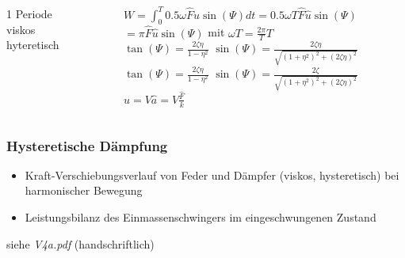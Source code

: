 \begin{frame}
        \begin{columns}
                \begin{column}[t]{0.2 \textwidth}
                        1 Periode 
                        \vspace{0.65cm}\\
                        viskos 
                        \vspace{0.24cm}\\
                        hyteretisch
                \end{column}

                \begin{column}[t]{0.8 \textwidth}
                        $W= \int_{0}^{T} 0.5 \omega \hat{F} \hat{u} \sin(\Psi) dt = 0.5 \omega T \hat{F} \hat{u} \sin(\Psi)$ \\
                        $= \pi \hat{F} \hat{u} \sin(\Psi)$ \hspace{0.2cm} mit $\omega T = \frac{2 \pi}{T} T$ \\
                        $\tan(\Psi) = \frac{2 \zeta \eta}{1-\eta^2}$ \hspace{0.5cm} $\sin(\Psi) = \frac{2 \zeta \eta}{\sqrt{(1+\eta^2)^2 + (2 \zeta \eta)^2}}$\footnotemark \\
                        $\tan(\Psi) = \frac{2 \zeta \eta}{1-\eta^2}$ \hspace{0.5cm} $\sin(\Psi) = \frac{2 \zeta}{\sqrt{(1+\eta^2)^2 + (2 \zeta \eta)^2}}$\footnotemark \\
                        $\hat{u} = V \hat{a} = V \frac{\hat{F}}{k}$
                \end{column}
        \end{columns}

\end{frame}

\begin{frame}
\frametitle{Hysteretische Dämpfung}
        \begin{itemize}
                \item Kraft-Verschiebungsverlauf von Feder und Dämpfer (viskos, hysteretisch) bei harmonischer Bewegung
                \item Leistungsbilanz des Einmassenschwingers im eingeschwungenen Zustand
        \end{itemize}
        \vfill

        \hfill siehe \textsl{V4a.pdf} (handschriftlich)
\end{frame}

